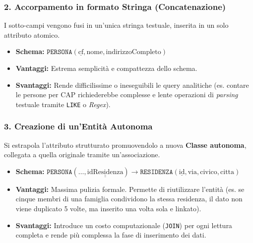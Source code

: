 \subsubsection*{2. Accorpamento in formato Stringa (Concatenazione)}
I sotto-campi vengono fusi in un'unica stringa testuale, inserita in un solo attributo atomico.
\begin{itemize}
    \item \textbf{Schema:} $\texttt{PERSONA}(\underline{\text{cf}}, \text{nome}, \text{indirizzoCompleto})$
    \item \textbf{Vantaggi:} Estrema semplicità e compattezza dello schema.
    \item \textbf{Svantaggi:} Rende difficilissime o ineseguibili le query analitiche (es. contare le persone per CAP richiederebbe complesse e lente operazioni di \textit{parsing} testuale tramite \texttt{LIKE} o \textit{Regex}).
\end{itemize}

\subsubsection*{3. Creazione di un'Entità Autonoma}
Si estrapola l'attributo strutturato promuovendolo a nuova \textbf{Classe autonoma}, collegata a quella originale tramite un'associazione.
\begin{itemize}
    \item \textbf{Schema:} $\texttt{PERSONA}(\dots, \underline{\underline{\text{idResidenza}}}) \rightarrow \texttt{RESIDENZA}(\underline{\text{id}}, \text{via}, \text{civico}, \text{citta})$
    \item \textbf{Vantaggi:} Massima pulizia formale. Permette di riutilizzare l'entità (es. se cinque membri di una famiglia condividono la stessa residenza, il dato non viene duplicato 5 volte, ma inserito una volta sola e linkato).
    \item \textbf{Svantaggi:} Introduce un costo computazionale (\texttt{JOIN}) per ogni lettura completa e rende più complessa la fase di inserimento dei dati.
\end{itemize}

